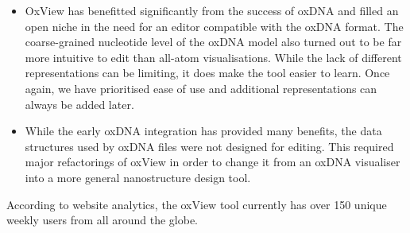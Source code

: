 \begin{itemize}
\item OxView has benefitted significantly from the success of oxDNA and filled an open niche in the need for an editor compatible with the oxDNA format. The coarse-grained nucleotide level of the oxDNA model also turned out to be far more intuitive to edit than all-atom visualisations. While the lack of different representations can be limiting, it does make the tool easier to learn. Once again, we have prioritised ease of use and additional representations can always be added later.
\item While the early oxDNA integration has provided many benefits, the data structures used by oxDNA files were not designed for editing. This required major refactorings of oxView in order to change it from an oxDNA visualiser into a more general nanostructure design tool.

\end{itemize}

According to website analytics, the oxView tool currently has over 150 unique weekly users from all around the globe.